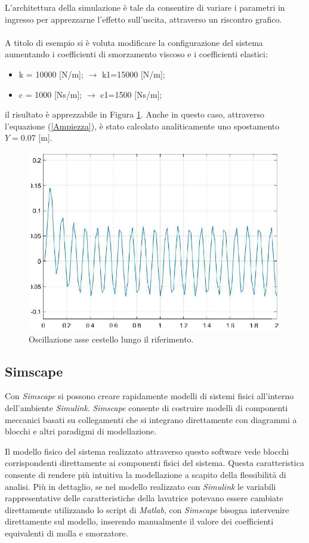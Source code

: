 L'architettura della simulazione è tale da consentire di variare i parametri in ingresso per apprezzarne l'effetto sull'uscita, attraverso un riscontro grafico.
\\\\
A titolo di esempio si è voluta modificare la configurazione del sistema aumentando i coefficienti di smorzamento viscoso e i coefficienti elastici:
\begin{itemize}
    \item k = 10000 [N/m]; $\to$ k1=15000 [N/m];
    \item c = 1000 [Ns/m]; $\to$ c1=1500 [Ns/m];
\end{itemize}
il risultato è apprezzabile in Figura \ref{SecondoPlot}. Anche in questo caso,  attraverso l'equazione (\ref{Ampiezza}), è stato calcolato analiticamente uno spostamento $Y=0.07$ [m].
\begin{figure}[h]
    \centering
    \includegraphics[scale=0.6]{SecondoPlot.JPG}
    \caption{Oscillazione asse cestello lungo il riferimento.}
    \label{SecondoPlot}
\end{figure}
\subsection{Simscape}
Con \textit{Simscape} si possono creare rapidamente modelli di sistemi fisici all’interno dell’ambiente \textit{Simulink}. \textit{Simscape} consente di costruire modelli di componenti meccanici basati su collegamenti che si integrano direttamente con diagrammi a blocchi e altri paradigmi di modellazione. 

Il modello fisico del sistema realizzato attraverso questo software vede blocchi corrispondenti direttamente ai componenti fisici del sistema. Questa caratteristica consente di rendere più intuitiva la modellazione a scapito della flessibilità di analisi. Più in dettaglio, se nel modello realizzato con \textit{Simulink} le variabili rappresentative delle caratteristiche della lavatrice potevano essere cambiate direttamente utilizzando lo script di \textit{Matlab}, con \textit{Simscape} bisogna intervenire direttamente sul modello, inserendo manualmente il valore dei coefficienti equivalenti di molla e smorzatore. 
